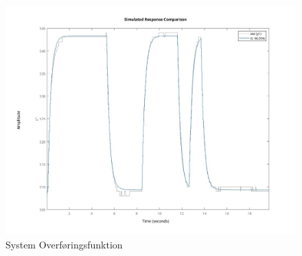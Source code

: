\documentclass[../main.tex]{subfiles}
\begin{document}
\begin{figure}[h]
      \includegraphics[width=\textwidth]{Dokumentation/Figures/Motor Model Fit.jpg}
     \caption{System Overføringsfunktion}
     \label{fig: System Overføringsfunktion}
\end{figure}
\end{document}
